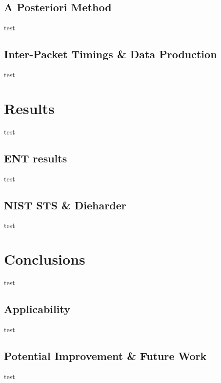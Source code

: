 \documentclass{beamer}
\begin{document}
\subsection{A Posteriori Method}
\begin{frame}
test
\end{frame}
\subsection{Inter-Packet Timings \& Data Production}
\begin{frame}
test
\end{frame}
\section{Results}
\begin{frame}
\end{frame}

\begin{frame}
test
\end{frame}
\subsection{ENT results}
\begin{frame}
test
\end{frame}
\subsection{NIST STS \& Dieharder}
\begin{frame}
test
\end{frame}
\section{Conclusions}
\begin{frame}
\end{frame}

\begin{frame}
test
\end{frame}
\subsection{Applicability}
\begin{frame}
test
\end{frame}
\subsection{Potential Improvement \& Future Work}
\begin{frame}
test
\end{frame}
\end{document}
